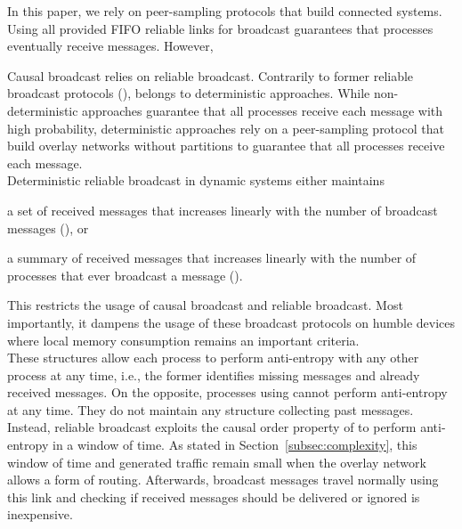 In this paper, we rely on peer-sampling protocols that build connected
systems. Using all provided FIFO reliable links for broadcast guarantees that
processes eventually receive messages. However,







Causal broadcast relies on reliable broadcast. 
Contrarily to former reliable broadcast protocols (\REF), \RPCBROADCAST belongs
to deterministic approaches. While non-deterministic approaches guarantee that
all processes receive each message with high probability, deterministic
approaches rely on a peer-sampling protocol that build overlay networks without
partitions to guarantee that all processes receive each message. \\
Deterministic reliable broadcast in dynamic systems either maintains
\begin{inparaenum}[(i)]
\item a set of received messages that increases linearly with the number of
  broadcast messages (\REF), or
\item a summary of received messages that increases linearly with the number of
  processes that ever broadcast a message (\REF). 
\end{inparaenum}
This restricts the usage of causal broadcast and reliable broadcast. Most
importantly, it dampens the usage of these broadcast protocols on humble devices
where local memory consumption remains an important criteria. \\
These structures allow each process to perform anti-entropy with any other
process at any time, i.e., the former identifies missing messages and already
received messages. On the opposite, processes using \RPCBROADCAST cannot perform
anti-entropy at any time. They do not maintain any structure collecting past
messages. Instead, reliable broadcast exploits the causal order property of
\RPCBROADCAST to perform anti-entropy in a window of time. As stated in
Section~\ref{subsec:complexity}, this window of time and generated traffic
remain small when the overlay network allows a form of routing. Afterwards,
broadcast messages travel normally using this link and checking if received
messages should be delivered or ignored is inexpensive.

